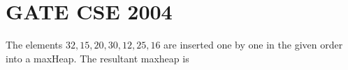 \documentclass[14pt]{extarticle}
\begin{document}
\newpage
\section{GATE CSE 2004}
The elements $32, 15, 20, 30, 12, 25, 16$ are inserted one by one in the given order into a maxHeap.
The resultant maxheap is


\end{document}
